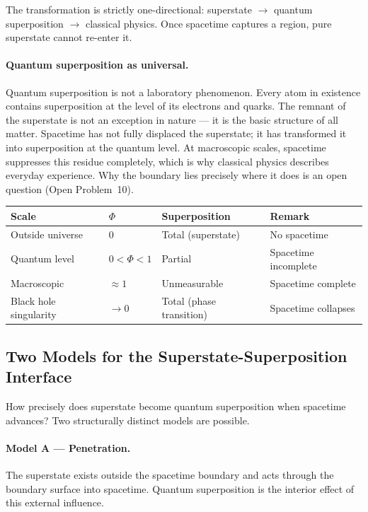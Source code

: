 \documentclass[12pt,a4paper]{article}
\begin{document}
The transformation is strictly one-directional: superstate
$\to$ quantum superposition $\to$ classical physics.  Once spacetime
captures a region, pure superstate cannot re-enter it.

\paragraph{Quantum superposition as universal.}
Quantum superposition is not a laboratory phenomenon.  Every atom
in existence contains superposition at the level of its electrons and
quarks.  The remnant of the superstate is not an exception in nature
— it is the basic structure of all matter.  Spacetime has not fully
displaced the superstate; it has transformed it into superposition at
the quantum level.  At macroscopic scales, spacetime suppresses this
residue completely, which is why classical physics describes everyday
experience.  Why the boundary lies precisely where it does is an
open question (Open Problem~10).

\begin{center}
\renewcommand{\arraystretch}{1.3}
\begin{tabular}{lllp{3.5cm}}
\toprule
\textbf{Scale} & \textbf{$\Phi$} & \textbf{Superposition} & \textbf{Remark}\\
\midrule
Outside universe & $0$ & Total (superstate) & No spacetime\\
Quantum level & $0 < \Phi < 1$ & Partial & Spacetime incomplete\\
Macroscopic & $\approx 1$ & Unmeasurable & Spacetime complete\\
Black hole singularity & $\to 0$ & Total (phase transition) & Spacetime collapses\\
\bottomrule
\end{tabular}
\end{center}

\subsection{Two Models for the Superstate-Superposition Interface}
\label{sec:twomodels}

How precisely does superstate become quantum superposition when spacetime
advances?  Two structurally distinct models are possible.

\paragraph{Model A — Penetration.}
The superstate exists outside the spacetime boundary and acts through
the boundary surface into spacetime.  Quantum superposition is the
interior effect of this external influence.
\end{document}
